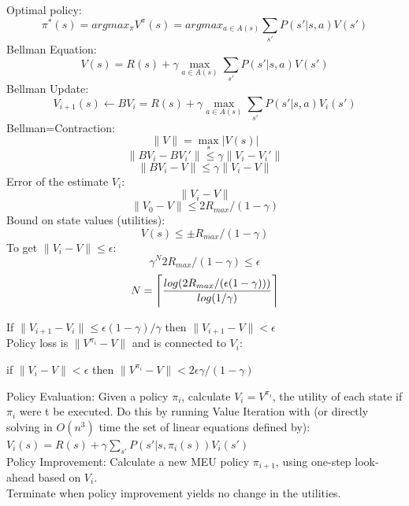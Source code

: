 \documentclass[10pt,landscape]{article}
\DeclarePairedDelimiter{\ceil}{\lceil}{\rceil}
\newcommand{\norm}[1]{\lVert#1\rVert}
\begin{document}
\raggedright
\footnotesize
\begin{multicols}{3}


\setlength{\premulticols}{1pt}
\setlength{\postmulticols}{1pt}
\setlength{\multicolsep}{1pt}
\setlength{\columnsep}{2pt}


Optimal policy:
    $$ \pi^*(s) = argmax_{\pi} V^{\pi}(s) = argmax_{a \in A(s)} \sum_{s'} P(s' | s, a) V(s') $$
Bellman Equation:
    $$ V(s) = R(s) + \gamma \max_{a \in A(s)} \sum_{s'} P(s' | s, a) V(s') $$
Bellman Update:
    $$ V_{i+1}(s) \leftarrow B V_i = R(s) + \gamma \max_{a \in A(s)} \sum_{s'} P(s' | s, a) V_i(s') $$
Bellman=Contraction:
    $$ \norm{V} = \max_s \lvert V(s) \rvert $$
    $$ \norm{B V_i - B V_i'} \leq \gamma \norm{V_i - V_i'} $$
    $$ \norm{B V_i - V} \leq \gamma \norm{V_i - V} $$
Error of the estimate $V_i$:
    $$ \norm{V_i - V} $$
    $$ \norm{V_0 - V} \leq 2 R_{max} / (1 - \gamma) $$
Bound on state values (utilities):
    $$ V(s) \leq \pm R_{max} / (1 - \gamma) $$
To get $\norm{V_i - V} \leq \epsilon$:
    $$ \gamma^N 2 R_{max} / (1 - \gamma) \leq \epsilon $$
    $$ N = \ceil[\Bigg]{\frac{log(2R_{max}/(\epsilon(1-\gamma)))}{log(1/\gamma)}} $$

If $\norm{V_{i+1} - V_i} \leq \epsilon (1 - \gamma) / \gamma$ then $\norm{V_{i+1} - V} < \epsilon$ \\

Policy loss is $\norm{V^{\pi_i} - V}$ and is connected to $V_i$:
\begin{center}
    if $\norm{V_i - V} < \epsilon$ then $\norm{V^{\pi_i} - V} < 2\epsilon\gamma/(1-\gamma)$
\end{center}


    \indent Policy Evaluation: Given a policy $\pi_i$, calculate $V_i = V^{\pi_i}$, the utility of each state if $\pi_i$ were t be executed. Do this by running Value Iteration with (or directly solving in $O(n^3)$ time the set of linear equations defined by): $V_i(s) = R(s) + \gamma \sum_{s'} P(s' | s, \pi_i(s)) V_i(s')$ \\
    \indent Policy Improvement: Calculate a new MEU policy $\pi_{i+1}$, using one-step look-ahead based on $V_i$. \\
    \indent Terminate when policy improvement yields no change in the utilities. \\



\end{multicols}
\end{document}
